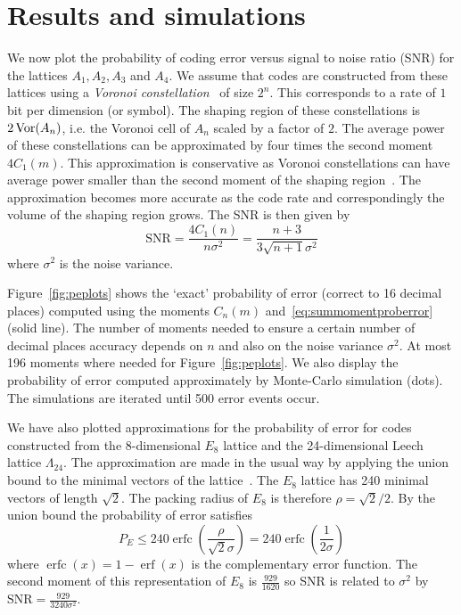 \documentclass[draftcls, onecolumn, 11pt]{IEEEtran}
\begin{document}
\section{Results and simulations}\label{sec:results-simulations}

We now plot the probability of coding error versus signal to noise ratio (SNR) for the lattices $A_1, A_2, A_3$ and $A_4$.  We assume that codes are constructed from these lattices using a \emph{Voronoi constellation}~\cite{Conway1983VoronoiCodes} of size $2^n$.  This corresponds to a rate of $1$ bit per dimension (or symbol).  The shaping region of these constellations is $2\operatorname{Vor}(A_n)$, i.e. the Voronoi cell of $A_n$ scaled by a factor of $2$.  The average power of these constellations can be approximated by four times the second moment $4C_1(m)$.  This approximation is conservative as Voronoi constellations can have average power smaller than the second moment of the shaping region~\cite{Conway1983VoronoiCodes}.  The approximation becomes more accurate as the code rate and correspondingly the volume of the shaping region grows.  %
The SNR is then given by
\[
\text{SNR} = \frac{4C_1(n)}{n \sigma^2} = \frac{n+3}{3\sqrt{n+1}\sigma^2}
\]   
where $\sigma^2$ is the noise variance.  %

Figure~\ref{fig:peplots} shows the `exact' probability of error (correct to 16 decimal places) computed using the moments $C_n(m)$ and~\eqref{eq:summomentproberror} (solid line).  The number of moments needed to ensure a certain number of decimal places accuracy depends on $n$ and also on the noise variance $\sigma^2$.  At most 196 moments where needed for Figure~\ref{fig:peplots}.  We also display the probability of error computed approximately by Monte-Carlo simulation (dots).  %
The simulations are iterated until 500 error events occur.

We have also plotted approximations for the probability of error for codes constructed from the 8-dimensional $E_8$ lattice and the 24-dimensional Leech lattice $\Lambda_{24}$.  The approximation are made in the usual way by applying the union bound to the minimal vectors of the lattice~\cite[p.~71]{SPLAG}.  The $E_8$ lattice has 240 minimal vectors of length $\sqrt{2}$.  The packing radius of $E_8$ is therefore $\rho = \sqrt{2}/2$.  By the union bound the probability of error satisfies 
\newcommand{\erfc}{\operatorname{erfc}}
\newcommand{\erf}{\operatorname{erf}}
\[
P_E \leq 240\erfc\left( \frac{\rho}{\sqrt{2}\sigma} \right) = 240\erfc\left(\frac{1}{2\sigma}\right)
\]
where $\erfc(x) = 1 - \erf(x)$ is the complementary error function.  The second moment of this representation of $E_8$ is $\frac{929}{1620}$ so SNR is related to $\sigma^2$ by $\text{SNR} = \frac{929}{3240\sigma^2}$.
\end{document}
